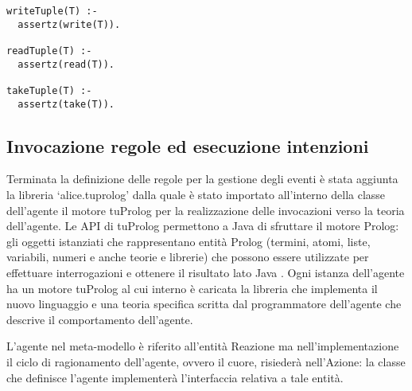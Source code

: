 \medskip
\begin{lstlisting}[firstnumber=1,label={lst:ImplementazioneRegoleSpatialTuples},caption={Implementazione regole estensione Spatial Tuples}]
writeTuple(T) :-
  assertz(write(T)).

readTuple(T) :-
  assertz(read(T)).

takeTuple(T) :-
  assertz(take(T)).
\end{lstlisting}

\subsection{Invocazione regole ed esecuzione intenzioni}\label{sctn:InvocazioneEsecuzioneIntenzioni}
Terminata la definizione delle regole per la gestione degli eventi è stata aggiunta la libreria `alice.tuprolog' dalla quale è stato importato all'interno della classe dell'agente il motore tuProlog per la realizzazione delle invocazioni verso la teoria dell'agente.
Le API di tuProlog permettono a Java di sfruttare il motore Prolog: gli oggetti istanziati che rappresentano entità Prolog (termini, atomi, liste, variabili, numeri e anche teorie e librerie) che possono essere utilizzate per effettuare interrogazioni e ottenere il risultato lato Java \cite{2p-alpnews2013}.
Ogni istanza dell'agente ha un motore tuProlog al cui interno è caricata la libreria che implementa il nuovo linguaggio e una teoria specifica scritta dal programmatore dell'agente che descrive il comportamento dell'agente.

L'agente nel meta-modello è riferito all'entità Reazione ma nell'implementazione il ciclo di ragionamento dell'agente, ovvero il cuore, risiederà nell'Azione: la classe che definisce l'agente implementerà l'interfaccia relativa a tale entità.

